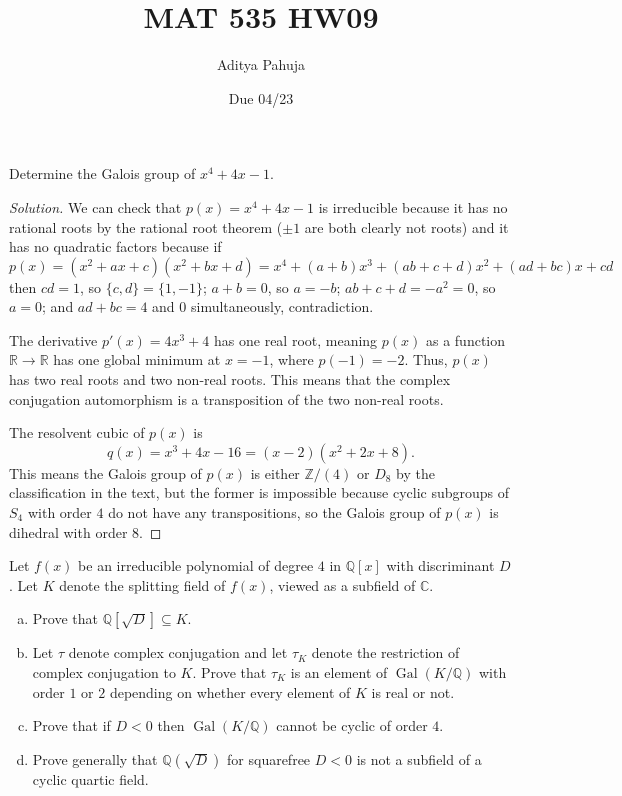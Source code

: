 \documentclass[10pt]{article}
\title{MAT 535 HW09}
\author{\large Aditya Pahuja}
\date{\large Due 04/23}
\providecommand{\Gal}{\operatorname{Gal}}
\providecommand{\CC}{\mathbb C}
\providecommand{\QQ}{\mathbb Q}
\providecommand{\RR}{\mathbb R}
\providecommand{\ZZ}{\mathbb Z}
\providecommand{\ii}{\item}
\newenvironment{soln}{\begin{proof}[Solution]}{\end{proof}}
\begin{document}
\maketitle

\begin{problem}
    [\S14.6\#9]
    Determine the Galois group of $x^4 + 4x - 1$.
\end{problem}

\begin{soln}
    We can check that $p(x) = x^4 + 4x - 1$ is irreducible because
    it has no rational roots by the rational root theorem
    ($\pm 1$ are both clearly not roots) and
    it has no quadratic factors because if
    \begin{equation*}
        p(x) = (x^2 + ax + c)(x^2 + bx + d)
	= x^4 + (a + b)x^3 + (ab + c + d)x^2
	+ (ad + bc)x + cd
    \end{equation*}
    then $cd = 1$, so $\{c,d\} = \{1,-1\}$;
    $a+b = 0$, so $a = -b$;
    $ab + c + d = -a^2 = 0$, so $a = 0$;
    and $ad + bc = 4$ and $0$ simultaneously, contradiction.

    The derivative $p'(x) = 4x^3 + 4$ has one real root,
    meaning $p(x)$ as a function $\RR\to\RR$ has one global minimum
    at $x = -1$, where $p(-1) = -2$. Thus, $p(x)$
    has two real roots and two non-real roots.
    This means that the complex conjugation automorphism
    is a transposition of the two non-real roots.

    The resolvent cubic of $p(x)$ is
    \begin{equation*}
        q(x) = x^3 + 4x - 16 = (x - 2)(x^2 + 2x + 8).
    \end{equation*}
    This means the Galois group of $p(x)$
    is either $\ZZ/(4)$ or $D_8$
    by the classification in the text,
    but the former is impossible because cyclic subgroups of $S_4$
    with order $4$ do not have any transpositions,
    so the Galois group of $p(x)$ is dihedral with order $8$.
\end{soln}

\begin{problem}
    [\S14.6\#19]
    Let $f(x)$ be an irreducible polynomial of degree $4$
    in $\QQ[x]$ with discriminant $D$.
    Let $K$ denote the splitting field of $f(x)$,
    viewed as a subfield of $\CC$.
    \begin{enumerate}[(a)]
	\ii Prove that $\QQ[\sqrt D]\subseteq K$.
	\ii Let $\tau$ denote complex conjugation
	and let $\tau_K$ denote the restriction of complex conjugation to $K$.
	Prove that $\tau_K$ is an element of $\Gal(K/\QQ)$
	with order $1$ or $2$
	depending on whether every element of $K$ is real or not.
	\ii Prove that if $D < 0$ then $\Gal(K/\QQ)$
	cannot be cyclic of order $4$.
	\ii Prove generally that $\QQ(\sqrt D)$ for squarefree $D < 0$
	is not a subfield of a cyclic quartic field.
    \end{enumerate}
\end{problem}
\end{document}

